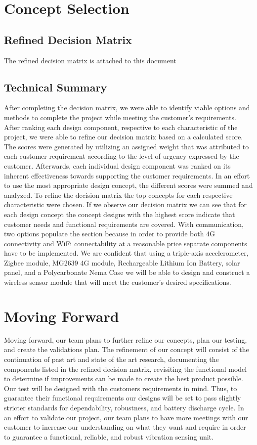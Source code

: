 \documentclass[12pt]{article}
\begin{document}
\newpage

\section{Concept Selection}

\subsection{Refined Decision Matrix}
The refined decision matrix is attached to this document

\subsection{Technical Summary}
After completing the decision matrix, we were able to identify viable options and methods to complete the project while meeting the customer's requirements. After ranking each design component, respective to each characteristic of the project, we were able to refine our decision matrix based on a calculated score. The scores were generated by utilizing an assigned weight that was attributed to each customer requirement according to the level of urgency expressed by the customer. Afterwards, each individual design component was ranked on its inherent effectiveness towards supporting the customer requirements. In an effort to use the most appropriate design concept, the different scores were summed and analyzed. To refine the decision matrix the top concepts for each respective characteristic were chosen. If we observe our decision matrix we can see that for each design concept the concept designs with the highest score indicate that customer needs and functional requirements are covered. With communication, two options populate the section because in order to provide both 4G connectivity and WiFi connectability at a reasonable price separate components have to be implemented. We are confident that using a triple-axis accelerometer, Zigbee module, MG2639 4G module, Rechargeable Lithium Ion Battery, solar panel, and a Polycarbonate Nema Case we will be able to design and construct a wireless sensor module that will meet the customer's desired specifications. 

\section{Moving Forward}

Moving forward, our team plans to further refine our concepts, plan our testing, and create the validations plan. The refinement of our concept will consist of the continuation of past art and state of the art research, documenting the components  listed in the refined decision matrix, revisiting the functional model to determine if improvements can be made to create the best product possible. Our test will be designed with the customers requirements in mind. Thus, to guarantee their functional requirements our designs will be set to pass slightly stricter standards for dependability, robustness, and battery discharge cycle. In an effort to validate our project, our team plans to have more meetings with our customer to increase our understanding on what they want and require in order to guarantee a functional, reliable, and robust vibration sensing unit. 
\end{document}
